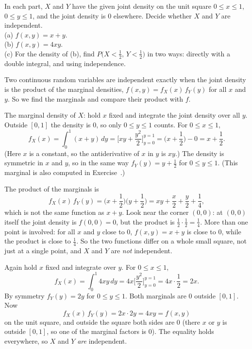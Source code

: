 
\begin{problem}
	In each part, $X$ and $Y$ have the given joint density on the unit square
	$0\le x\le 1$, $0\le y\le 1$, and the joint density is $0$ elsewhere.
	Decide whether $X$ and $Y$ are independent.\\
	(a) $f(x,y)=x+y$.\\
	(b) $f(x,y)=4xy$.\\
	(c) For the density of (b), find $P\big(X<\frac12,\,Y<\frac12\big)$ in
	two ways: directly with a double integral, and using independence.
\end{problem}

\begin{solution}
	\idea Two continuous random variables are independent exactly when the
	joint density is the product of the marginal densities,
	$f(x,y)=f_X(x)\,f_Y(y)$ for all $x$ and $y$. So we find the marginals and
	compare their product with $f$.

	 The marginal density of $X$: hold $x$ fixed and integrate the
	joint density over all $y$. Outside $[0,1]$ the density is $0$, so only
	$0\le y\le1$ counts. For $0\le x\le1$,
	\[
		f_X(x)=\int_0^1 (x+y)\,dy=\Big[xy+\frac{y^2}{2}\Big]_{y=0}^{y=1}
		=\Big(x+\frac12\Big)-0=x+\frac12 .
	\]
	(Here $x$ is a constant, so the antiderivative of $x$ in $y$ is $xy$.)
	The density is symmetric in $x$ and $y$, so in the same way
	$f_Y(y)=y+\frac12$ for $0\le y\le1$. (This marginal is also computed in
	Exercise~.)

	The product of the marginals is
	\[
		f_X(x)\,f_Y(y)=\Big(x+\frac12\Big)\Big(y+\frac12\Big)
		=xy+\frac{x}{2}+\frac{y}{2}+\frac14 ,
	\]
	which is not the same function as $x+y$. Look near the corner $(0,0)$:
	at $(0,0)$ itself the joint density is $f(0,0)=0$, but the product is
	$\frac12\cdot\frac12=\frac14$. More than one point is involved: for all
	$x$ and $y$ close to $0$, $f(x,y)=x+y$ is close to $0$, while the product
	is close to $\frac14$. So the two functions differ on a whole small square,
	not just at a single point, and $X$ and $Y$ are \emph{not} independent.

	 Again hold $x$ fixed and integrate over $y$. For $0\le x\le1$,
	\[
		f_X(x)=\int_0^1 4xy\,dy=4x\Big[\frac{y^2}{2}\Big]_{y=0}^{y=1}
		=4x\cdot\frac12=2x .
	\]
	By symmetry $f_Y(y)=2y$ for $0\le y\le1$. Both marginals are $0$ outside
	$[0,1]$. Now
	\[
		f_X(x)\,f_Y(y)=2x\cdot 2y=4xy=f(x,y)
	\]
	on the unit square, and outside the square both sides are $0$ (there $x$
	or $y$ is outside $[0,1]$, so one of the marginal factors is $0$). The
	equality holds everywhere, so $X$ and $Y$ \emph{are} independent.


\end{solution}
